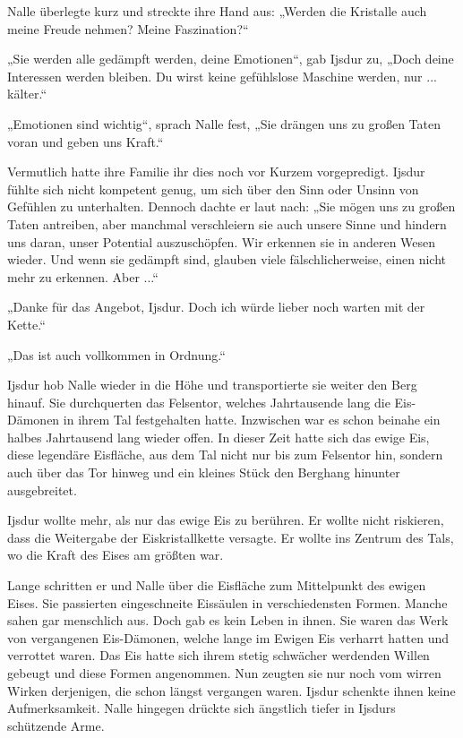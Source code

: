 Nalle überlegte kurz und streckte ihre Hand aus: „Werden die Kristalle auch meine Freude nehmen? Meine Faszination?“

„Sie werden alle gedämpft werden, deine Emotionen“, gab Ijsdur zu, „Doch deine Interessen werden bleiben. Du wirst keine gefühlslose Maschine werden, nur ... kälter.“

„Emotionen sind wichtig“, sprach Nalle fest, „Sie drängen uns zu großen Taten voran und geben uns Kraft.“

Vermutlich hatte ihre Familie ihr dies noch vor Kurzem vorgepredigt. Ijsdur fühlte sich nicht kompetent genug, um sich über den Sinn oder Unsinn von Gefühlen zu unterhalten. Dennoch dachte er laut nach: „Sie mögen uns zu großen Taten antreiben, aber manchmal verschleiern sie auch unsere Sinne und hindern uns daran, unser Potential auszuschöpfen. Wir erkennen sie in anderen Wesen wieder. Und wenn sie gedämpft sind, glauben viele fälschlicherweise, einen nicht mehr zu erkennen. Aber ...“

„Danke für das Angebot, Ijsdur. Doch ich würde lieber noch warten mit der Kette.“

„Das ist auch vollkommen in Ordnung.“

Ijsdur hob Nalle wieder in die Höhe und transportierte sie weiter den Berg hinauf. Sie durchquerten das Felsentor, welches Jahrtausende lang die Eis-Dämonen in ihrem Tal festgehalten hatte. Inzwischen war es schon beinahe ein halbes Jahrtausend lang wieder offen. In dieser Zeit hatte sich das ewige Eis, diese legendäre Eisfläche, aus dem Tal nicht nur bis zum Felsentor hin, sondern auch über das Tor hinweg und ein kleines Stück den Berghang hinunter ausgebreitet.

Ijsdur wollte mehr, als nur das ewige Eis zu berühren. Er wollte nicht riskieren, dass die Weitergabe der Eiskristallkette versagte. Er wollte ins Zentrum des Tals, wo die Kraft des Eises am größten war.

Lange schritten er und Nalle über die Eisfläche zum Mittelpunkt des ewigen Eises. Sie passierten eingeschneite Eissäulen in verschiedensten Formen. Manche sahen gar menschlich aus. Doch gab es kein Leben in ihnen. Sie waren das Werk von vergangenen Eis-Dämonen, welche lange im Ewigen Eis verharrt hatten und verrottet waren. Das Eis hatte sich ihrem stetig schwächer werdenden Willen gebeugt und diese Formen angenommen. Nun zeugten sie nur noch vom wirren Wirken derjenigen, die schon längst vergangen waren. Ijsdur schenkte ihnen keine Aufmerksamkeit. Nalle hingegen drückte sich ängstlich tiefer in Ijsdurs schützende Arme.

